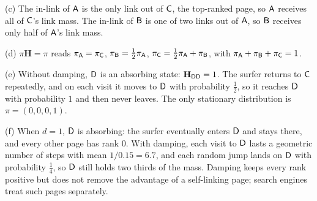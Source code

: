\begin{enumerate}[resume*=quiz]
\begin{solution}
(c) The in-link of $\mathsf{A}$ is the only link out of $\mathsf{C}$, the top-ranked page, so $\mathsf{A}$ receives all of $\mathsf{C}$'s link mass. The in-link of $\mathsf{B}$ is one of two links out of $\mathsf{A}$, so $\mathsf{B}$ receives only half of $\mathsf{A}$'s link mass.

(d) $\pi\mathbf H=\pi$ reads $\pi_{\mathsf{A}}=\pi_{\mathsf{C}}$, $\pi_{\mathsf{B}}=\tfrac12\pi_{\mathsf{A}}$, $\pi_{\mathsf{C}}=\tfrac12\pi_{\mathsf{A}}+\pi_{\mathsf{B}}$, with $\pi_{\mathsf{A}}+\pi_{\mathsf{B}}+\pi_{\mathsf{C}}=1$.

(e) Without damping, $\mathsf{D}$ is an absorbing state: $\mathbf H_{\mathsf{D}\mathsf{D}}=1$. The surfer returns to $\mathsf{C}$ repeatedly, and on each visit it moves to $\mathsf{D}$ with probability $\tfrac12$, so it reaches $\mathsf{D}$ with probability $1$ and then never leaves. The only stationary distribution is $\pi=(0,0,0,1)$.

(f) When $d=1$, $\mathsf{D}$ is absorbing: the surfer eventually enters $\mathsf{D}$ and stays there, and every other page has rank $0$. With damping, each visit to $\mathsf{D}$ lasts a geometric number of steps with mean $1/0.15=6.7$, and each random jump lands on $\mathsf{D}$ with probability $\tfrac14$, so $\mathsf{D}$ still holds two thirds of the mass. Damping keeps every rank positive but does not remove the advantage of a self-linking page; search engines treat such pages separately.
\end{solution}


\end{enumerate}
